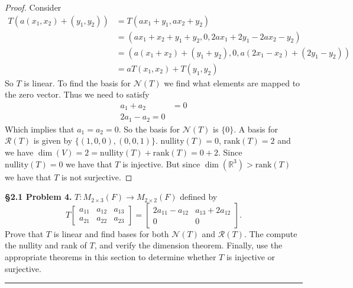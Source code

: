 \documentclass[leqno]{article}
\theoremstyle{nonumberplain}
\newtheorem{proof}{Proof}
\begin{document}
\begin{proof}
Consider
\begin{align*}
T(a(x_1,x_2)+(y_1,y_2))&=T(ax_1+y_1,ax_2+y_2)\\
&=(ax_1+x_2+y_1+y_2,0,2ax_1+2y_1-2ax_2-y_2)\\
&=(a(x_1+x_2)+(y_1+y_2),0,a(2x_1-x_2)+(2y_1-y_2))\\
&=aT(x_1,x_2)+T(y_1,y_2)
\end{align*}
So $T$ is linear. To find the basis for $\mathcal{N}(T)$ we find what elements are mapped to the zero vector. Thus we need to satisfy 
\begin{align*}
a_1+a_2&=0\\
2a_1-a_2=0
\end{align*}
Which implies that $a_1=a_2=0$. So the basis for $\mathcal{N}(T)$ is $\{0\}$. A basis for $\mathcal{R}(T)$ is given by $\{(1,0,0),(0,0,1)\}$. $\textrm{nullity}(T)=0$, $\textrm{rank}(T)=2$ and we have $\dim(V)=2=\textrm{nullity}(T)+\textrm{rank}(T)=0+2$.  Since $\textrm{nullity}(T)=0$ we have that $T$ is injective.  But since $\dim(\mathbb{R}^3)>\textrm{rank}(T)$ we have that $T$ is not surjective.
\end{proof}

\pagebreak




\noindent\textbf{\S 2.1 Problem 4.} $T\colon M_{2\times 3}(F) \to M_{2\times 2}(F)$ defined by 
\[T
\begin{bmatrix}
a_{11} & a_{12} & a_{13}\\
a_{21} & a_{22} & a_{23}
\end{bmatrix}
=
\begin{bmatrix}
2a_{11}-a_{12} & a_{13}+2a_{12}\\
0 & 0
\end{bmatrix}
.\] Prove that $T$ is linear and find bases for both $\mathcal{N}(T)$ and $\mathcal{R}(T)$. The compute the nullity and rank of $T$, and verify the dimension theorem. Finally, use the appropriate theorems in this section to determine whether $T$ is injective or surjective.

\noindent\rule[0.5ex]{\linewidth}{1pt}
\end{document}

